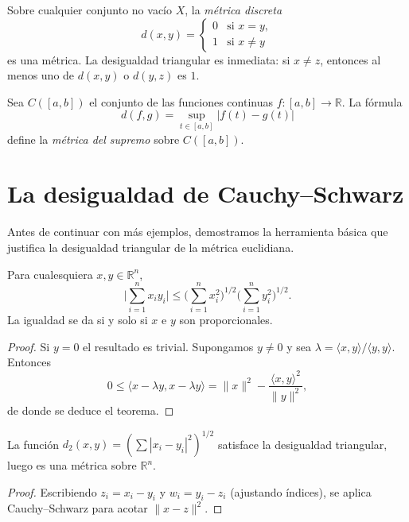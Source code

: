 \begin{example}
\label{ej:discreta}
Sobre cualquier conjunto no vacío $X$, la \emph{métrica discreta}
\[
  d(x,y)=\begin{cases}0&\text{si }x=y,\\1&\text{si }x\neq y\end{cases}
\]
es una métrica. La desigualdad triangular es inmediata: si $x\neq z$, entonces al menos uno de $d(x,y)$ o $d(y,z)$ es $1$.
\end{example}

\begin{example}
\label{ej:supremo}
Sea $C([a,b])$ el conjunto de las funciones continuas $f\colon[a,b]\to\mathbb{R}$. La fórmula
\begin{equation}\label{eq:supremo}
  d(f,g)=\sup_{t\in[a,b]}|f(t)-g(t)|
\end{equation}
define la \emph{métrica del supremo} sobre $C([a,b])$.
\end{example}

\section{La desigualdad de Cauchy--Schwarz}

Antes de continuar con más ejemplos, demostramos la herramienta básica que justifica la desigualdad triangular de la métrica euclidiana.

\begin{theorem}
\label{teo:cauchy-schwarz-cap5}
Para cualesquiera $x,y\in\mathbb{R}^n$,
\[
  \biggl|\sum_{i=1}^{n}x_i y_i\biggr|\leq\biggl(\sum_{i=1}^{n}x_i^2\biggr)^{1/2}\biggl(\sum_{i=1}^{n}y_i^2\biggr)^{1/2}.
\]
La igualdad se da si y solo si $x$ e $y$ son proporcionales.
\end{theorem}
\begin{proof}
Si $y=0$ el resultado es trivial. Supongamos $y\neq 0$ y sea $\lambda=\langle x,y\rangle/\langle y,y\rangle$. Entonces
\[
  0\leq\langle x-\lambda y,x-\lambda y\rangle=\|x\|^2-\frac{\langle x,y\rangle^2}{\|y\|^2},
\]
de donde se deduce el teorema.
\end{proof}

\begin{corollary}
\label{cor:euclidiana-metrica}
La función $d_2(x,y)=(\sum|x_i-y_i|^2)^{1/2}$ satisface la desigualdad triangular, luego es una métrica sobre $\mathbb{R}^n$.
\end{corollary}
\begin{proof}
Escribiendo $z_i=x_i-y_i$ y $w_i=y_i-z_i$ (ajustando índices), se aplica Cauchy--Schwarz para acotar $\|x-z\|^2$.
\end{proof}

